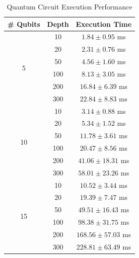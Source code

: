 
\begin{table}[htbp]
\centering
\caption{Quantum Circuit Execution Performance}
\label{tab:qiskit_results}
\begin{tabular}{|c|c|c|}
\hline
\textbf{\# Qubits} & \textbf{Depth} & \textbf{Execution Time} \\
\hline
\multirow{6}{*}{5} & 10 & $1.84 \pm 0.95$ ms \\
 & 20 & $2.31 \pm 0.76$ ms \\
 & 50 & $4.56 \pm 1.60$ ms \\
 & 100 & $8.13 \pm 3.05$ ms \\
 & 200 & $16.84 \pm 6.39$ ms \\
 & 300 & $22.84 \pm 8.83$ ms \\
\hline
\multirow{6}{*}{10} & 10 & $3.14 \pm 0.88$ ms \\
 & 20 & $5.34 \pm 1.52$ ms \\
 & 50 & $11.78 \pm 3.61$ ms \\
 & 100 & $20.47 \pm 8.56$ ms \\
 & 200 & $41.06 \pm 18.31$ ms \\
 & 300 & $58.01 \pm 23.26$ ms \\
\hline
\multirow{6}{*}{15} & 10 & $10.52 \pm 3.44$ ms \\
 & 20 & $19.39 \pm 7.47$ ms \\
 & 50 & $49.51 \pm 16.43$ ms \\
 & 100 & $98.38 \pm 31.75$ ms \\
 & 200 & $168.56 \pm 57.03$ ms \\
 & 300 & $228.81 \pm 63.49$ ms \\
\hline
\end{tabular}
\end{table}